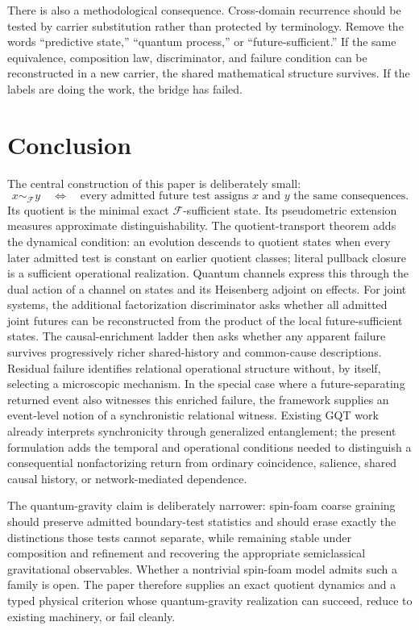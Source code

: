 \documentclass[11pt]{article}
\newcommand{\F}{\mathcal F}
\begin{document}
There is also a methodological consequence. Cross-domain recurrence should be tested by carrier substitution rather than protected by terminology. Remove the words ``predictive state,'' ``quantum process,'' or ``future-sufficient.'' If the same equivalence, composition law, discriminator, and failure condition can be reconstructed in a new carrier, the shared mathematical structure survives. If the labels are doing the work, the bridge has failed.

\section{Conclusion}

The central construction of this paper is deliberately small:
\begin{equation}
  x\sim_{\F}y
  \quad\Longleftrightarrow\quad
  \text{every admitted future test assigns }x\text{ and }y\text{ the same consequences}.
\end{equation}
Its quotient is the minimal exact $\F$-sufficient state. Its pseudometric extension measures approximate distinguishability. The quotient-transport theorem adds the dynamical condition: an evolution descends to quotient states when every later admitted test is constant on earlier quotient classes; literal pullback closure is a sufficient operational realization. Quantum channels express this through the dual action of a channel on states and its Heisenberg adjoint on effects. For joint systems, the additional factorization discriminator asks whether all admitted joint futures can be reconstructed from the product of the local future-sufficient states. The causal-enrichment ladder then asks whether any apparent failure survives progressively richer shared-history and common-cause descriptions. Residual failure identifies relational operational structure without, by itself, selecting a microscopic mechanism. In the special case where a future-separating returned event also witnesses this enriched failure, the framework supplies an event-level notion of a synchronistic relational witness. Existing GQT work already interprets synchronicity through generalized entanglement; the present formulation adds the temporal and operational conditions needed to distinguish a consequential nonfactorizing return from ordinary coincidence, salience, shared causal history, or network-mediated dependence.

The quantum-gravity claim is deliberately narrower: spin-foam coarse graining should preserve admitted boundary-test statistics and should erase exactly the distinctions those tests cannot separate, while remaining stable under composition and refinement and recovering the appropriate semiclassical gravitational observables. Whether a nontrivial spin-foam model admits such a family is open. The paper therefore supplies an exact quotient dynamics and a typed physical criterion whose quantum-gravity realization can succeed, reduce to existing machinery, or fail cleanly.
\end{document}
